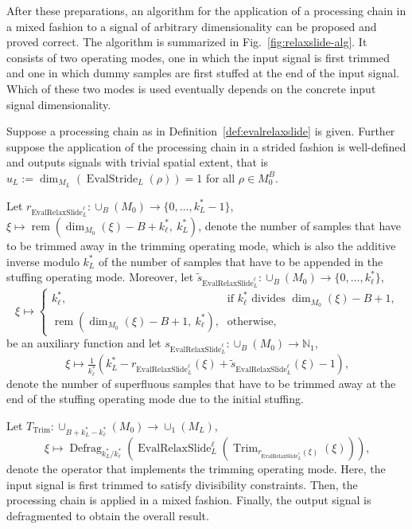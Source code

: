 \documentclass[journal]{IEEEtran}
\newcommand{\N}{\mathbb{N}}
\newcommand{\ROI}{B}
\newcommand{\discint}[2]{\{#1,\dotsc,#2\}}
\DeclareMathOperator{\Defragmentation}{Defrag}
\DeclareMathOperator{\EvalStride}{EvalStride}
\DeclareMathOperator{\Trimming}{Trim}
\newcommand{\rem}[2]{\operatorname{rem}(#1,\ #2)}
\DeclareMathOperator{\EvalRelaxSlide}{EvalRelaxSlide}
\begin{document}
After these preparations, an algorithm for the application of a processing chain in a mixed fashion to a signal of arbitrary dimensionality can be proposed and proved correct.
The algorithm is summarized in Fig.~\ref{fig:relaxslide-alg}.
It consists of two operating modes, one in which the input signal is first trimmed and one in which dummy samples are first stuffed at the end of the input signal.
Which of these two modes is used eventually depends on the concrete input signal dimensionality.
\begin{theorem}
\label{thm:evalrelaxslide}
Suppose a processing chain as in Definition~\ref{def:evalrelaxslide} is given.
Further suppose the application of the processing chain in a strided fashion is well-defined and outputs signals with trivial spatial extent, that is $u_L := \dim_{M_L}(\EvalStride_L(\rho)) = 1$ for all $\rho\in M_0^\ROI$.

Let $r_{\EvalRelaxSlide_L^\ell}\colon\cup_\ROI(M_0)\to\discint{0}{k_L^* - 1}$, $\xi\mapsto\rem{\dim_{M_0}(\xi) - \ROI + k_\ell^*}{k_L^*}$, denote the number of samples that have to be trimmed away in the trimming operating mode, which is also the additive inverse modulo $k_L^*$ of the number of samples that have to be appended in the stuffing operating mode.
Moreover, let $\tilde{s}_{\EvalRelaxSlide_L^\ell}\colon\cup_\ROI(M_0)\to\discint{0}{k_\ell^*}$,
\begin{displaymath}
  \xi\mapsto
  \begin{cases}
    k_\ell^*\text{,} & \text{if }k_\ell^*\text{ divides }\dim_{M_0}(\xi) - \ROI + 1\text{,}\\
    \rem{\dim_{M_0}(\xi) - \ROI + 1}{k_\ell^*}\text{,} & \text{otherwise,}
  \end{cases}
\end{displaymath}
be an auxiliary function and let $s_{\EvalRelaxSlide_L^\ell}\colon\cup_\ROI(M_0)\to\N_1$,
\begin{displaymath}
  \xi\mapsto\tfrac{1}{k_\ell^*}(k_L^* - r_{\EvalRelaxSlide_L^\ell}(\xi) + \tilde{s}_{\EvalRelaxSlide_L^\ell}(\xi) - 1)\text{,}
\end{displaymath}
denote the number of superfluous samples that have to be trimmed away at the end of the stuffing operating mode due to the initial stuffing.

Let $T_{\Trimming}\colon\cup_{\ROI + k_L^* - k_\ell^*}(M_0)\to\cup_1(M_L)$,
\begin{displaymath}
  \xi\mapsto \Defragmentation_{k_L^* / k_\ell^*}( \EvalRelaxSlide_L^\ell( \Trimming_{r_{\EvalRelaxSlide_L^\ell}(\xi)}(\xi) ) )\text{,}
\end{displaymath}
denote the operator that implements the trimming operating mode.
Here, the input signal is first trimmed to satisfy divisibility constraints.
Then, the processing chain is applied in a mixed fashion.
Finally, the output signal is defragmented to obtain the overall result.


\end{theorem}
\end{document}
